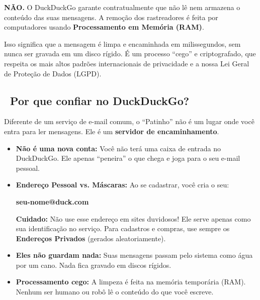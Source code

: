 \vspace{0.3cm}

\begin{tcolorbox}[colback=NordBackground, colframe=DuckDuckGoOrange, coltext=white, title=\faShield* \ \textbf{Eles vão ler os meus e-mails?}]
	\textbf{NÃO.} O DuckDuckGo garante contratualmente que não lê nem armazena o conteúdo das suas mensagens. A remoção dos rastreadores é feita por computadores usando \textbf{Processamento em Memória (RAM)}. 
	
	\vspace{0.3cm}
	\noindent
	Isso significa que a mensagem é limpa e encaminhada em milissegundos, sem nunca ser gravada em um disco rígido. É um processo \enquote{cego} e criptografado, que respeita os mais altos padrões internacionais de privacidade e a nossa Lei Geral de Proteção de Dados (LGPD).
\end{tcolorbox}

\subsection*{\faLock \ Por que confiar no DuckDuckGo? \cite{DuckDuckGoPrivacy2023}}

Diferente de um serviço de e-mail comum, o \enquote{Patinho} não é um lugar onde você entra para ler mensagens. Ele é um \textbf{servidor de encaminhamento}.

\begin{itemize}
	\item \textbf{Não é uma nova conta:} Você não terá uma caixa de entrada no DuckDuckGo. Ele apenas \enquote{peneira} o que chega e joga para o seu e-mail pessoal.
	\item \textbf{Endereço Pessoal vs. Máscaras:} Ao se cadastrar, você cria o seu:
	\vspace{0.3cm}
	\noindent
	\begin{center}
		\begin{tcolorbox}[
			colback=NordBackground, 
			colframe=DuckDuckGoOrange, 
			width=0.8\linewidth, 
			halign=center,       %
			valign=center,       %
			boxrule=1pt, 
			arc=2mm,
			top=3mm,             %
			bottom=3mm           %
			]
			\Large \sffamily \textbf{\textcolor{DuckDuckGoOrange}{\textbf{seu-nome@duck.com}}}
		\end{tcolorbox}
	\end{center}
	\vspace{0.3cm}
	\textbf{Cuidado:} Não use esse endereço em sites duvidosos! Ele serve apenas como sua identificação no serviço. Para cadastros e compras, use sempre os \textbf{Endereços Privados} (gerados aleatoriamente).
	\item \textbf{Eles não guardam nada:} Suas mensagens passam pelo sistema como água por um cano. Nada fica gravado em discos rígidos.
	\item \textbf{Processamento cego:} A limpeza é feita na memória temporária (RAM). Nenhum ser humano ou robô lê o conteúdo do que você escreve.
\end{itemize}

